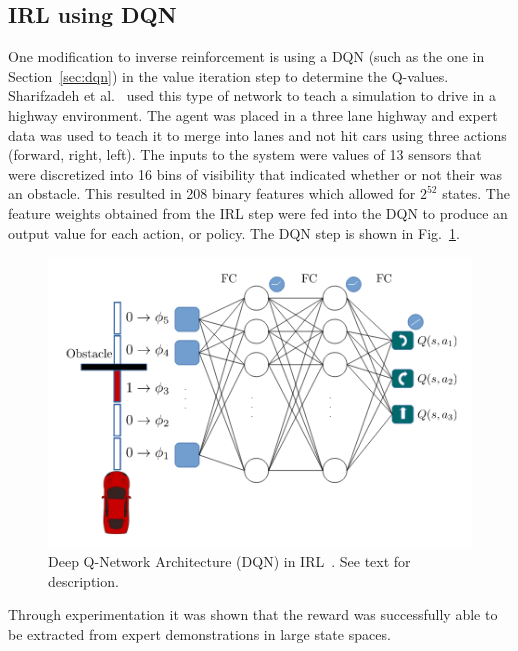 \documentclass[12pt,american]{report}
\begin{document}
\subsection{IRL using DQN}
One modification to inverse reinforcement is using a DQN (such as the one in Section~\ref{sec:dqn}) in the value iteration step to determine the Q-values. Sharifzadeh et al.~\cite{sharifzadeh2016learning} used this type of network to teach a simulation to drive in a highway environment. The agent was placed in a three lane highway and expert data was used to teach it to merge into lanes and not hit cars using three actions (forward, right, left).  The inputs to the system were values of 13 sensors that were discretized into 16 bins of visibility that indicated whether or not their was an obstacle. This resulted in 208 binary features which allowed for $2^{52}$ states. The feature weights obtained from the IRL step were fed into the DQN to produce an output value for each action, or policy. The DQN step is shown in Fig.~\ref{fig:irl-dqn}.
\begin{figure}
\centering
\includegraphics[scale=1.5]{images/irl-dqn.png}
\caption{Deep Q-Network Architecture (DQN) in IRL~\cite{sharifzadeh2016learning}. See text for description.}
\label{fig:irl-dqn}
\end{figure}
Through experimentation it was shown that the reward was successfully able to be extracted from expert demonstrations in large state spaces.
\end{document}
